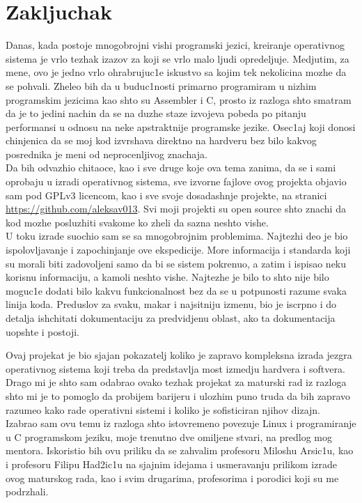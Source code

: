 \documentclass[a4paper,fleqn,12pt]{JMThesis}
\newcommand\eng{\fontencoding{OT1}\fontfamily{\rmdefault}\selectfont}
\begin{document}
\chapter{Zakljuchak}

Danas, kada postoje mnogobrojni vishi programski jezici, kreiranje operativnog
sistema je vrlo tezhak izazov za koji se vrlo malo ljudi opredeljuje. Medjutim,
za mene, ovo je jedno vrlo ohrabrujuc1e iskustvo sa kojim tek nekolicina mozhe
da se pohvali. Zheleo bih da u buduc1nosti primarno programiram u nizhim
programskim jezicima kao shto su {\eng Assembler} i {\eng C}, prosto iz razloga
shto smatram da je to jedini nachin da se na duzhe staze izvojeva pobeda po
pitanju performansi u odnosu na neke apstraktnije programske jezike. Osec1aj
koji donosi chinjenica da se moj kod izvrshava direktno na hardveru bez bilo
kakvog posrednika je meni od neprocenljivog znachaja.\\

Da bih odvazhio chitaoce, kao i sve druge koje ova tema zanima, da se i sami
oprobaju u izradi operativnog sistema, sve izvorne fajlove ovog projekta
objavio sam pod {\eng GPLv3} licencom, kao i sve svoje dosadashnje projekte, na
stranici {\eng\url{https://github.com/aleksav013}}. Svi moji projekti su {\eng
open source} shto znachi da kod mozhe posluzhiti svakome ko zheli da sazna
neshto vishe.\\

U toku izrade suochio sam se sa mnogobrojnim problemima. Najtezhi deo je bio
ispolovljavanje i zapochinjanje ove ekspedicije. More informacija i standarda
koji su morali biti zadovoljeni samo da bi se sistem pokrenuo, a zatim i
ispisao neku korisnu informaciju, a kamoli neshto vishe. Najtezhe je bilo to
shto nije bilo moguc1e dodati bilo kakvu funkcionalnost bez da se u potpunosti
razume svaka linija koda. Preduslov za svaku, makar i najsitniju izmenu, bio je
iscrpno i do detalja ish\/chitati dokumentaciju za predvidjenu oblast, ako ta
dokumentacija uopshte i postoji.\\

\newpage

Ovaj projekat je bio sjajan pokazatelj koliko je zapravo kompleksna izrada
jezgra operativnog sistema koji treba da predstavlja most izmedju hardvera i
softvera. Drago mi je shto sam odabrao ovako tezhak projekat za maturski rad iz
razloga shto mi je to pomoglo da probijem barijeru i ulozhim puno truda da bih
zapravo razumeo kako rade operativni sistemi i koliko je sofisticiran njihov
dizajn.\\

Izabrao sam ovu temu iz razloga shto istovremeno povezuje {\eng Linux} i
programiranje u {\eng C} programskom jeziku, moje trenutno dve omiljene stvari,
na predlog mog mentora. Iskoristio bih ovu priliku da se zahvalim profesoru
Miloshu Arsic1u, kao i profesoru Filipu Had2ic1u na sjajnim idejama i
usmeravanju prilikom izrade ovog maturskog rada, kao i svim drugarima,
profesorima i porodici koji su me podrzhali.


\thispagestyle{empty}
\mbox{}
\clearpage

\nocite{*}
\printbibliography[heading=bibintoc,title={Literatura}]
\end{document}
